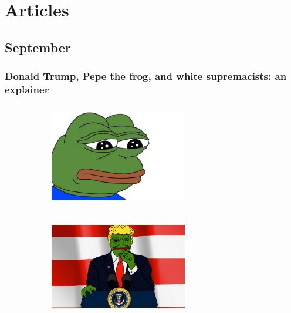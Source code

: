 \documentclass[twoside]{article}
\begin{document}
          \section{Articles}
          \subsection{September}
          \subsubsection{Donald Trump, Pepe the frog, and white supremacists: an explainer}
          \vskip2cm
          \begin{figure}[H]
            \centering
            \begin{subfigure}{.4\textwidth}
              \centering
              \includegraphics[width=6cm,height=4.5cm,keepaspectratio]{images/articles/pepe0.jpg}
              \end{subfigure}%
              \begin{subfigure}{.4\textwidth}
                \centering
                \includegraphics[width=6cm,height=4.5cm,keepaspectratio]{images/articles/pepe1.jpg}
                \end{subfigure}%
              \end{figure}
\end{document}
